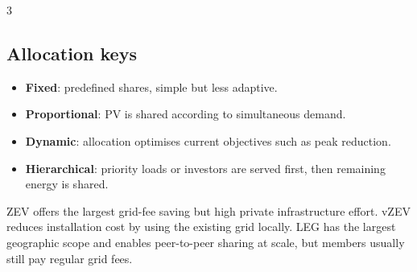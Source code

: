 \documentclass[9pt, landscape, a4paper]{article}
\begin{document}
\begin{multicols*}{3}
\subsection{Allocation keys}
\begin{itemize}
  \item \textbf{Fixed}: predefined shares, simple but less adaptive.
  \item \textbf{Proportional}: PV is shared according to simultaneous demand.
  \item \textbf{Dynamic}: allocation optimises current objectives such as peak reduction.
  \item \textbf{Hierarchical}: priority loads or investors are served first, then remaining energy is shared.
\end{itemize}
ZEV offers the largest grid-fee saving but high private infrastructure effort.
vZEV reduces installation cost by using the existing grid locally. LEG has the
largest geographic scope and enables peer-to-peer sharing at scale, but members
usually still pay regular grid fees.

\end{multicols*}
\end{document}
